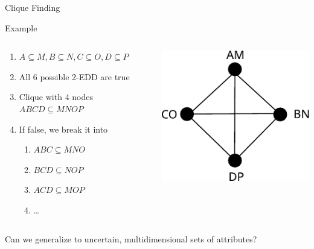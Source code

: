 \documentclass[10pt]{beamer}
\begin{document}
\begin{frame}{Clique Finding}
    \begin{exampleblock}{Example}
        \begin{columns}
        \begin{column}{.7\textwidth}
        \begin{enumerate}
            \item $A \subseteq M, B \subseteq N, C \subseteq O, D \subseteq P$
            \item All 6 possible 2-EDD are true
            \item Clique with 4 nodes $ABCD \subseteq MNOP$
            \item If false, we break it into
                \begin{enumerate}
                    \item $ABC \subseteq MNO$
                    \item $BCD \subseteq NOP$
                    \item $ACD \subseteq MOP$
                    \item \ldots
                \end{enumerate}
        \end{enumerate}
        \end{column}
        \begin{column}{.3\textwidth}
            \includegraphics[width=\linewidth]{4clique}
        \end{column}
        \end{columns}
    \end{exampleblock}

    \pause
    \begin{block}{}
        \alert{Can we generalize to uncertain, multidimensional sets of attributes?}
    \end{block}
    
\end{frame}
\end{document}
